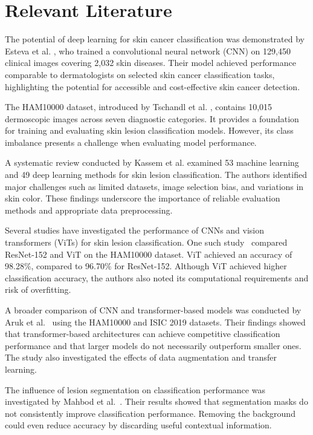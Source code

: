 \documentclass[conference]{IEEEtran}
\begin{document}
\section{Relevant Literature}
The potential of deep learning for skin cancer
classification was demonstrated by Esteva et al.
\cite{b1}, who trained a convolutional neural network
(CNN) on 129,450 clinical images covering 2,032
skin diseases. Their model achieved performance
comparable to dermatologists on selected skin
cancer classification tasks, highlighting the
potential for accessible and cost-effective
skin cancer detection.

The HAM10000 dataset, introduced by Tschandl et al.
\cite{b2}, contains 10,015 dermoscopic images
across seven diagnostic categories. It provides
a foundation for training and evaluating skin
lesion classification models. However, its
class imbalance presents a challenge when
evaluating model performance.

A systematic review conducted by Kassem et al.
\cite{b3} examined 53 machine learning and
49 deep learning methods for skin lesion
classification. The authors identified major
challenges such as limited datasets, image
selection bias, and variations in skin color.
These findings underscore the importance of
reliable evaluation methods and appropriate
data preprocessing.

Several studies have investigated the performance
of CNNs and vision transformers (ViTs) for skin
lesion classification. One such study~\cite{b4}
compared ResNet-152 and ViT on the HAM10000
dataset. ViT achieved an accuracy of 98.28\%,
compared to 96.70\% for ResNet-152. Although
ViT achieved higher classification accuracy,
the authors also noted its computational
requirements and risk of overfitting.

A broader comparison of CNN and transformer-based
models was conducted by Aruk et al.~\cite{b5}
using the HAM10000 and ISIC 2019 datasets.
Their findings showed that transformer-based
architectures can achieve competitive
classification performance and that larger
models do not necessarily outperform smaller
ones. The study also investigated the effects
of data augmentation and transfer learning.

The influence of lesion segmentation on
classification performance was investigated
by Mahbod et al.~\cite{b6}. Their results showed
that segmentation masks do not consistently
improve classification performance. Removing
the background could even reduce accuracy by
discarding useful contextual information.
\end{document}
